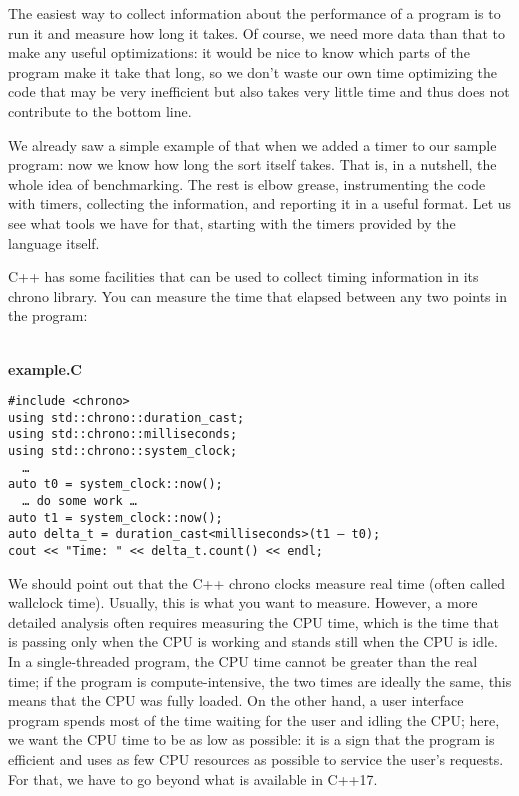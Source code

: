 
The easiest way to collect information about the performance of a program is to run it and measure how long it takes. Of course, we need more data than that to make any useful optimizations: it would be nice to know which parts of the program make it take that long, so we don't waste our own time optimizing the code that may be very inefficient but also takes very little time and thus does not contribute to the bottom line.

We already saw a simple example of that when we added a timer to our sample program: now we know how long the sort itself takes. That is, in a nutshell, the whole idea of benchmarking. The rest is elbow grease, instrumenting the code with timers, collecting the information, and reporting it in a useful format. Let us see what tools we have for that, starting with the timers provided by the language itself.


C++ has some facilities that can be used to collect timing information in its chrono library. You can measure the time that elapsed between any two points in the program:

\hspace*{\fill} \\ %
\noindent
\textbf{example.C}
\begin{lstlisting}[style=styleCXX]
#include <chrono>
using std::chrono::duration_cast;
using std::chrono::milliseconds;
using std::chrono::system_clock;
  …
auto t0 = system_clock::now();
  … do some work …
auto t1 = system_clock::now();
auto delta_t = duration_cast<milliseconds>(t1 – t0);
cout << "Time: " << delta_t.count() << endl;
\end{lstlisting}

We should point out that the C++ chrono clocks measure real time (often called wallclock time). Usually, this is what you want to measure. However, a more detailed analysis often requires measuring the CPU time, which is the time that is passing only when the CPU is working and stands still when the CPU is idle. In a single-threaded program, the CPU time cannot be greater than the real time; if the program is compute-intensive, the two times are ideally the same, this means that the CPU was fully loaded. On the other hand, a user interface program spends most of the time waiting for the user and idling the CPU; here, we want the CPU time to be as low as possible: it is a sign that the program is efficient and uses as few CPU resources as possible to service the user's requests. For that, we have to go beyond what is available in C++17.


